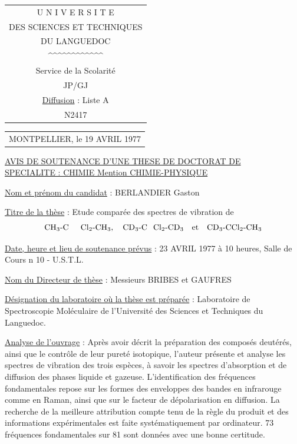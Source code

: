 \noindent\begin{tabular}[t]{@{}c@{}}
U N I V E R S I T E\\
DES SCIENCES ET TECHNIQUES\\
DU LANGUEDOC\\
\textasciicircum\textasciicircum\textasciicircum\textasciicircum\textasciicircum\textasciicircum\textasciicircum\textasciicircum\textasciicircum\textasciicircum\textasciicircum\textasciicircum\\[3pt]
Service de la Scolarité\\
JP/GJ\\[3pt]
\uline{Diffusion} : Liste A\\
N\textdegree{}2417
\end{tabular}\hfill\begin{tabular}[t]{@{}l@{}}
MONTPELLIER, le 19 AVRIL 1977\\
\end{tabular}

\begin{center}
\uline{AVIS DE SOUTENANCE D'UNE THESE DE DOCTORAT DE}\\[3pt]
\uline{SPECIALITE : CHIMIE Mention CHIMIE-PHYSIQUE}
\end{center}

\uline{Nom et prénom du candidat} : BERLANDIER Gaston

\uline{Titre de la thèse} : Etude comparée des spectres de vibration de
\[
\mathrm{CH}_{3}\text{-}\mathrm{C}\hphantom{\mathrm{CC}}\mathrm{Cl}_{2}\text{-}\mathrm{CH}_{3},\quad
\mathrm{CD}_{3}\text{-}\mathrm{C}\hphantom{\mathrm{C}}\mathrm{Cl}_{2}\text{-}\mathrm{CD}_{3}
\quad\text{et}\quad\mathrm{CD}_{3}\text{-}\mathrm{CCl}_{2}\text{-}\mathrm{CH}_{3}
\]

\uline{Date, heure et lieu de soutenance prévus} : 23 AVRIL 1977 à 10 heures, Salle de Cours n\textdegree{} 10 - U.S.T.L.

\uline{Nom du Directeur de thèse} : Messieurs BRIBES et GAUFRES

\uline{Désignation du laboratoire où la thèse est préparée} : Laboratoire de Spectroscopie Moléculaire de l'Université des Sciences et Techniques du Languedoc.

\uline{Analyse de l'ouvrage} : Après avoir décrit la préparation des composés deutérés, ainsi que le contrôle de leur pureté isotopique, l'auteur présente et analyse les spectres de vibration des trois espèces, à savoir les spectres d'absorption et de diffusion des phases liquide et gazeuse. L'identification des fréquences fondamentales repose sur les formes des enveloppes des bandes en infrarouge comme en Raman, ainsi que sur le facteur de dépolarisation en diffusion. La recherche de la meilleure attribution compte tenu de la règle du produit et des informations expérimentales est faite systématiquement par ordinateur. 73 fréquences fondamentales sur 81 sont données avec une bonne certitude.

